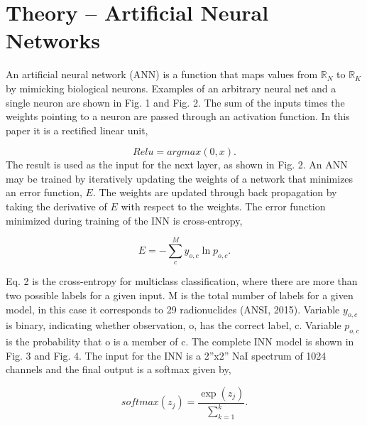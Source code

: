 \documentclass{anstrans}
\begin{document}
\section{Theory -- Artificial Neural Networks}

An artificial neural network (ANN) is a function that maps values from ${\mathbb{R}}_{N}$ to ${\mathbb{R}}_{K}$ by mimicking biological 
neurons. Examples of an arbitrary neural net and a single neuron are shown in Fig. 1 and Fig. 2. The 
sum of the inputs times the weights pointing to a neuron are passed through an activation function.
In this paper it is a rectified linear unit,

\begin{equation}
Relu = argmax(0, x).
\end{equation}
The result is used as the input for the next layer, as shown in Fig. 2. 
An ANN may be trained by iteratively updating the weights of a network that minimizes an error function, $E$. 
The weights are updated through back propagation by taking the derivative of $E$ with respect to the weights. 
The error function minimized during training of the INN is cross-entropy,

\begin{equation}
E = -\sum_{c}^{M}y_{o,c}\ln{p_{o,c}}.
\end{equation}


Eq. 2 is the cross-entropy for multiclass classification, where there are more than two possible labels 
for a given input. M is the total number of labels for a given model, in this case it corresponds to 29 
radionuclides (ANSI, 2015). Variable $y_{o,c}$ is binary, indicating whether observation, o, has the correct label, c. 
Variable $p_{o,c}$ is the probability that o is a member of c. The complete INN model is shown in Fig. 3 and Fig. 4. 
The input for the INN is a 2”x2” NaI spectrum of 1024 channels and the final output is a softmax given by,

\begin{equation}
softmax(z_j) = \frac{\exp(z_j)}{\sum_{k=1}^{k}}.
\end{equation}
\end{document}
